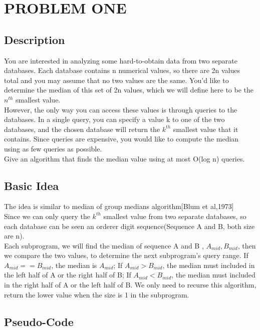 \documentclass[UTF8,a4paper]{article}
\begin{document}
	
	\newpage
	\section{PROBLEM ONE}
	\subsection{Description}
	
	You are interested in analyzing some hard-to-obtain data from two separate databases. Each database contains n numerical values, so there are 2n values total and you may assume that no two values are the same. You’d like to determine the median of this set of 2n values, which we will define here to be the $ n^{th} $ smallest value.\\
	However, the only way you can access these values is through queries to the databases. In a single query, you can specify a value k to one of the two databases, and the chosen database will return the $k^{th}$ smallest value that it contains. Since queries are expensive, you would like to compute the median using as few queries as possible.\\
	Give an algorithm that finds the median value using at most O(log n) queries.
	
	\subsection{Basic Idea}
	
	The idea is similar to median of group medians algorithm[Blum et al,1973]\\
	Since we can only query the $ k^{th} $ smallest value from two separate databases, so each database can be seen an orderer digit sequence(Sequence A and B, both size are n).\\
	Each subprogram, we will find the median of sequence A and B , $ A_{mid},B_{mid} $, then we compare the two values, to determine the next subprogram's query range. If $ A_{mid}==B_{mid} $, the median is $ A_{mid}$; If $ A_{mid} > B_{mid} $, the median must included in the left half of A or the right half of B; If $ A_{mid} < B_{mid} $, the median must included in the right half of A or the left half of B. We only need to recurse this algorithm, return the lower value when the size is 1 in the subprogram.   
	
	\subsection{Pseudo-Code}
	
\end{document}
